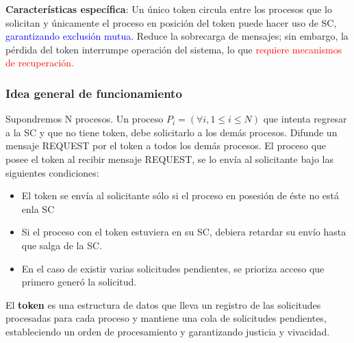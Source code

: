 \textbf{Características específica}: Un único token circula entre los procesos que lo solicitan y únicamente el proceso en posición del token puede hacer uso de SC, \textcolor{blue}{garantizando exclusión mutua}. Reduce la sobrecarga de mensajes; sin embargo, la pérdida del token interrumpe operación del sistema, lo que \textcolor{red}{requiere mecanismos de recuperación.}

\subsubsection{Idea general de funcionamiento}

Supondremos N procesos. Un proceso $P_i = (\forall i, 1 \leq i \leq N)$ que intenta regresar a la SC y que no tiene token, debe solicitarlo a los demás procesos. Difunde un mensaje REQUEST por el token a todos los demás procesos. El proceso que posee el token al recibir mensaje REQUEST, se lo envía al solicitante bajo las siguientes condiciones: 
\begin{itemize}
    \item El token se envía al solicitante sólo si el proceso en posesión de éste no está enla SC
    \item Si el proceso con el token estuviera en su SC, debiera retardar su envío hasta que salga de la SC.
    \item En el caso de existir varias solicitudes pendientes, se prioriza acceso que primero generó la solicitud.
\end{itemize}

El \textbf{token} es una estructura de datos que lleva un registro de las solicitudes procesadas para cada proceso y mantiene una cola de solicitudes pendientes, estableciendo un orden de procesamiento y garantizando justicia y vivacidad.

